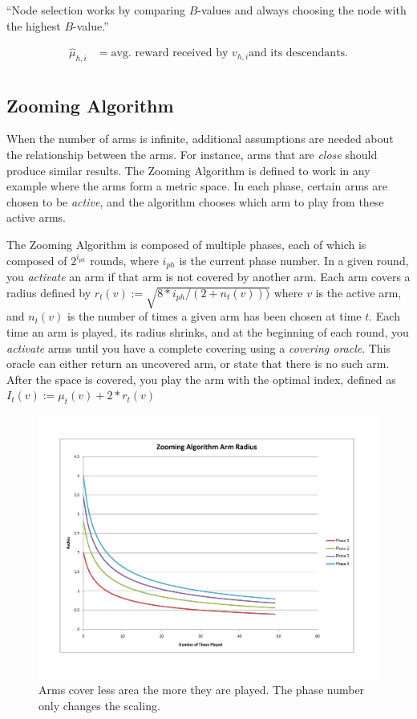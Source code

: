 ``Node selection works by comparing $B$-values and always choosing the
node with the highest $B$-value.''

\begin{align*}
  \hat{\mu}_{h,i} &= \text{avg. reward received by } v_{h,i} \text{
    and its descendants.}\\
\end{align*}



\subsection{Zooming Algorithm}
When the number of arms is infinite, additional assumptions are needed
about the relationship between the arms. For instance, arms that are
\emph{close} should produce similar results. The Zooming Algorithm is
defined to work in any example where the arms form a metric space. In
each phase, certain arms are chosen to be \emph{active}, and the
algorithm chooses which arm to play from these active arms.

The Zooming Algorithm is composed of multiple phases, each of which is
composed of $2^{i_{ph}}$ rounds, where $i_{ph}$ is the current phase
number. In a given round, you \emph{activate} an arm if that arm is
not covered by another arm. Each arm covers a radius defined by
$r_t(v):=\sqrt{8*i_{ph}/(2+n_t(v)))}$ where $v$ is the active arm, and
$n_t(v)$ is the number of times a given arm has been chosen at time
$t$. Each time an arm is played, its radius shrinks, and at the
beginning of each round, you \emph{activate} arms until you have a
complete covering using a \emph{covering oracle}. This oracle can
either return an uncovered arm, or state that there is no such
arm. After the space is covered, you play the arm with the optimal
index, defined as $I_t(v):=\mu_t(v)+2*r_t(v)$

\begin{figure}[!ht]
  \begin{center}
    \includegraphics[width=5 in]{figures/ZoomingRadius.png}
     \caption{Arms cover less area the more they are played. The phase
       number only changes the scaling.}
     \label{fig:zoomradius}
  \end{center}
\end{figure}


